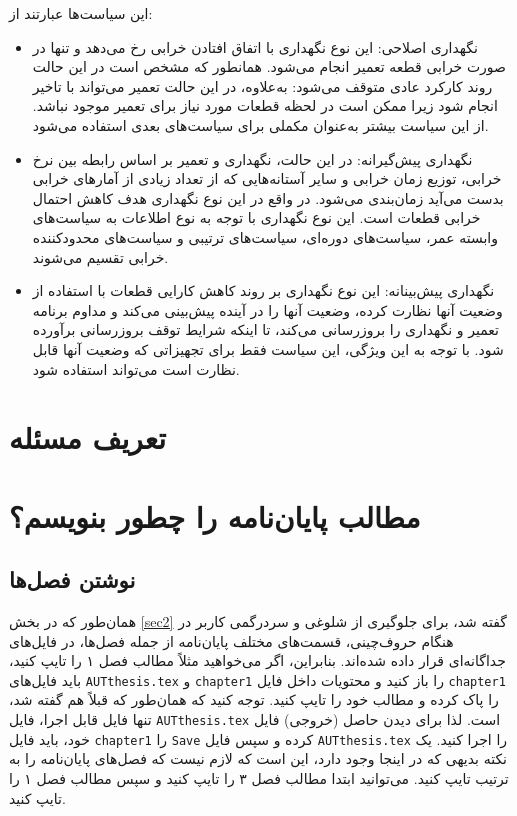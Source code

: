 این سیاست‌ها عبارتند از:
\begin{itemize}
\item نگهداری اصلاحی: این نوع نگهداری با اتفاق افتادن خرابی رخ می‌دهد و تنها در صورت خرابی قطعه تعمیر انجام می‌شود. همانطور که مشخص است در این حالت روند کارکرد عادی متوقف می‌شود: به‌علاوه، در این حالت تعمیر می‌تواند با تاخیر انجام شود زیرا ممکن است در لحظه قطعات مورد نیاز برای تعمیر موجود نباشد. از این سیاست بیشتر به‌عنوان مکملی برای سیاست‌های بعدی استفاده می‌شود\cite{zhao2022review}.

\item نگهداری پیش‌گیرانه: در این حالت، نگهداری و تعمیر بر اساس رابطه بین نرخ خرابی، توزیع زمان خرابی و سایر آستانه‌هایی که از تعداد زیادی از آمارهای خرابی بدست می‌آید زمان‌بندی می‌شود. در واقع در این نوع نگهداری هدف کاهش احتمال خرابی قطعات است. این نوع نگهداری با توجه به نوع اطلاعات به سیاست‌های وابسته عمر، سیاست‌های دوره‌ای، سیاست‌های ترتیبی و سیاست‌های محدودکننده خرابی تقسیم می‌شوند\cite{zhao2022review}.

\item نگهداری پیش‌بینانه: این نوع نگهداری بر روند کاهش کارایی قطعات با استفاده از وضعیت آنها نظارت کرده، وضعیت آنها را در آینده پیش‌بینی می‌کند و مداوم برنامه تعمیر و نگهداری را بروزرسانی می‌کند، تا اینکه شرایط توقف بروزرسانی برآورده شود. با توجه به این ویژگی، این سیاست فقط برای تجهیزاتی که وضعیت آنها قابل نظارت است می‌تواند استفاده شود\cite{zhao2022review}.
\end{itemize} 

\section{تعریف مسئله}

\section{مطالب پایان‌نامه را چطور بنویسم؟}
\subsection{نوشتن فصل‌ها}
همان‌طور که در بخش 
\ref{sec2}
گفته شد، برای جلوگیری از شلوغی و سردرگمی کاربر در هنگام حروف‌چینی، قسمت‌های مختلف پایان‌نامه از جمله فصل‌ها، در فایل‌های جداگانه‌ای قرار داده شده‌اند. 
بنابراین، اگر می‌خواهید مثلاً مطالب فصل ۱ را تایپ کنید، باید فایل‌های 
\verb;AUTthesis.tex;
و
\verb;chapter1;
را باز کنید و محتویات داخل فایل 
\verb;chapter1;
را پاک کرده و مطالب خود را تایپ کنید. توجه کنید که همان‌طور که قبلاً هم گفته شد، تنها فایل قابل اجرا، فایل 
\verb;AUTthesis.tex;
است. لذا برای دیدن حاصل (خروجی) فایل خود، باید فایل  
\verb;chapter1;
را 
\verb;Save;
کرده و سپس فایل 
\verb;AUTthesis.tex;
را اجرا کنید. یک نکته بدیهی که در اینجا وجود دارد، این است که لازم نیست که فصل‌های پایان‌نامه را به ترتیب تایپ کنید. می‌توانید ابتدا مطالب فصل ۳ را تایپ کنید و سپس مطالب فصل ۱ را تایپ کنید.

